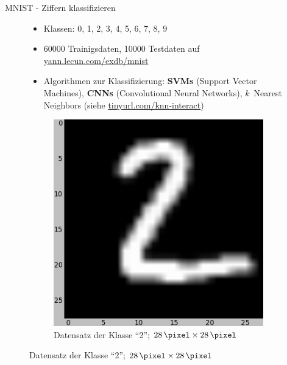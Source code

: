 \begin{frame}{MNIST - Ziffern klassifizieren}
    \begin{figure}[ht]
        \begin{minipage}[b]{0.45\linewidth}
            \begin{itemize}
                \item Klassen: 0, 1, 2, 3, 4, 5, 6, 7, 8, 9
                \item \num{60000} Trainigsdaten, \num{10000} Testdaten
                      auf \href{http://yann.lecun.com/exdb/mnist/}{yann.lecun.com/exdb/mnist}
                \item Algorithmen zur Klassifizierung: \textbf{SVMs} (Support Vector Machines),
                      \textbf{CNNs} (Convolutional Neural Networks),
                      $k$~Nearest Neighbors (siehe \href{http://martin-thoma.com/k-nearest-neighbor-classification-interactive-example/}{tinyurl.com/knn-interact})
            \end{itemize}
        \end{minipage}
        \hspace{0.5cm}
        \begin{minipage}[b]{0.45\linewidth}
            \begin{figure}
                \centering
                \includegraphics[width=\textwidth]{../images/mnist-2.png}
                \caption{Datensatz der Klasse \enquote{2}; $\SI{28}{\pixel} \times \SI{28}{\pixel}$}
                \label{fig:spline}
            \end{figure}
        \end{minipage}
    \end{figure}
\end{frame}

